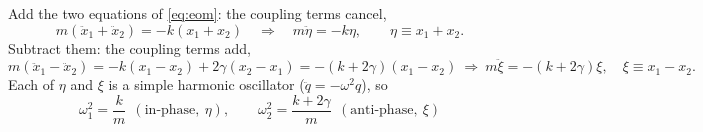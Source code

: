 \documentclass[11pt,a4paper]{article}
\begin{document}
Add the two equations of \eqref{eq:eom}: the coupling terms cancel,
\begin{equation}
m(\ddot x_1+\ddot x_2)=-k(x_1+x_2)\quad\Longrightarrow\quad m\ddot\eta=-k\eta,\qquad \eta\equiv x_1+x_2 .
\end{equation}
Subtract them: the coupling terms add,
\begin{equation}
m(\ddot x_1-\ddot x_2)=-k(x_1-x_2)+2\gamma(x_2-x_1)=-(k+2\gamma)(x_1-x_2)
\ \Longrightarrow\ m\ddot\xi=-(k+2\gamma)\xi,\quad \xi\equiv x_1-x_2 .
\end{equation}
Each of $\eta$ and $\xi$ is a simple harmonic oscillator ($\ddot q=-\omega^2q$), so
\begin{equation}
\boxed{\;\omega_1^2=\frac{k}{m}\ \ (\text{in-phase},\ \eta),\qquad \omega_2^2=\frac{k+2\gamma}{m}\ \ (\text{anti-phase},\ \xi)\;}
\label{eq:modes}
\end{equation}
\end{document}
